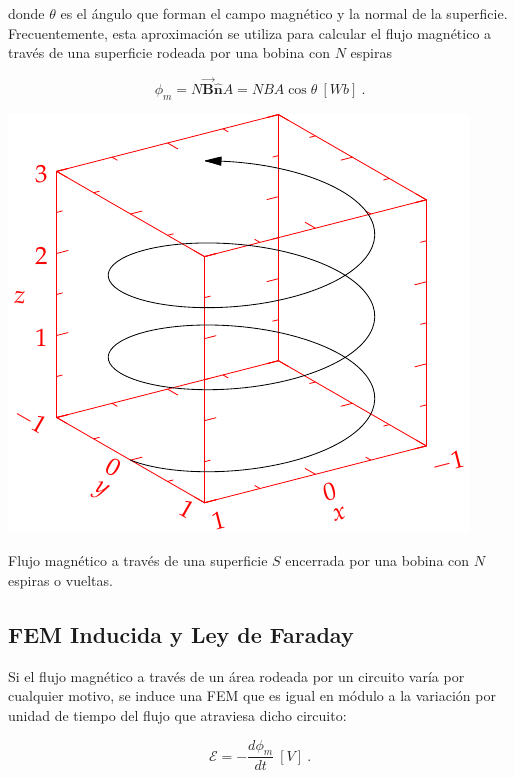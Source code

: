 \documentclass{tufte-handout}
\begin{document}
donde $\theta$ es el ángulo que forman el campo magnético y la normal de la superficie. Frecuentemente, esta aproximación se utiliza para calcular el flujo magnético a través de una superficie rodeada por una bobina con $N$ espiras

\begin{equation}
\phi_m = N\mathbf{\vec{B}}\mathbf{\hat{n}}A = NBA\cos{\theta} ~ [Wb]~.
\end{equation}

\begin{marginfigure}%
    \includegraphics[width=\linewidth]{helix}
    \caption{Flujo magnético a través de una superficie $S$ encerrada por una bobina con $N$ espiras o vueltas.}
    \label{fig:flujomagneticoespira}
\end{marginfigure}

\subsection{FEM Inducida y Ley de Faraday}

Si el flujo magnético a través de un área rodeada por un circuito varía por cualquier motivo, se induce una FEM que es igual en módulo a la variación por unidad de tiempo del flujo que atraviesa dicho circuito:

\begin{equation}
\mathcal{E} = -\displaystyle\frac{d\phi_m}{dt}~[V]~.
\end{equation}
\end{document}
